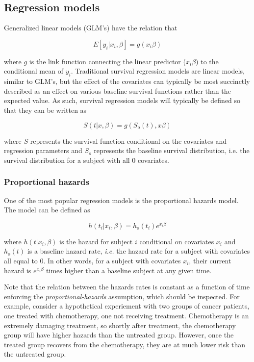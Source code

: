 \documentclass[a4paper]{article}
\begin{document}
  \subsection{Regression models}
  
  Generalized linear models (GLM's) have the relation that 
  
  \[
  E[y_i | x_i, \beta] = g(x_i \beta)
  \]
  
  where $g$ is the link function connecting the linear predictor ($x_i \beta$) to the conditional mean of $y_i$. Traditional survival regression models are linear models, similar to GLM's, but the effect of the covariates can typically be most succinctly  described as an effect on various baseline survival functions rather than the expected value. As such, survival regression models will typically be defined so that they can be written as 
  
  \[
  S(t | x, \beta) = g(S_o(t), x \beta ) 
  \]
  
  where $S$ represents the survival function conditional on the covariates and regression parameters and $S_o$ represents the baseline survival distribution, i.e. the survival distribution for a subject with all 0 covariates. 
  
    \subsubsection{Proportional hazards}
    
    One of the most popular regression models is the proportional hazards model. The model can be defined as
    
    \[
    h(t_i|x_i, \beta) = h_o(t_i) e^{x_i \beta}
    \]
    
    where $h(t|x_i, \beta)$ is the hazard for subject $i$ conditional on covariates $x_i$ and $h_o(t)$ is a baseline hazard rate, \emph{i.e.} the hazard rate for a subject with covariates all equal to 0. In other words, for a subject with covariates $x_i$, their current hazard is $e^{x_i \beta}$ times higher than a baseline subject at any given time.
    
    Note that the relation between the hazards rates is constant as a function of time enforcing the \emph{proportional-hazards} assumption, which should be inspected.  For example, consider a hypothetical experiement with two groups of cancer patients, one treated with chemotherapy, one not receiving treatment. Chemotherapy is an extremely damaging treatment, so shortly after treatment, the chemotherapy group will have higher hazards than the untreated group. However, once the treated group recovers from the chemotherapy, they are at much lower risk than the untreated group. 
    
\end{document}
